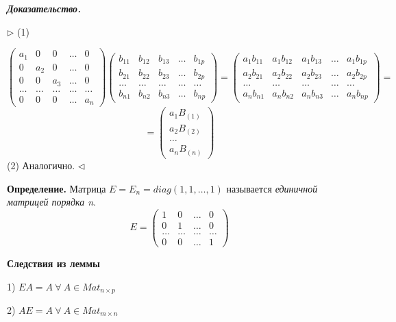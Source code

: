 \textbf{\textit{Доказательство.}}

$\rhd$ (1)

\[\begin{pmatrix} a_1 & 0 & 0 & \dots & 0 \\
0 & a_2 & 0 & \dots & 0 \\
0 & 0 & a_3 & \dots & 0 \\
\dots & \dots & \dots & \dots & \dots \\
0 & 0 & 0 & \dots & a_n 
\end{pmatrix} \begin{pmatrix} b_{11} & b_{12} & b_{13} & \dots & b_{1p} \\
b_{21} & b_{22} & b_{23} & \dots & b_{2p} \\
\dots & \dots & \dots & \dots & \dots \\
b_{n1} & b_{n2} & b_{n3} & \dots & b_{np}
\end{pmatrix} = \begin{pmatrix} a_1 b_{11} & a_1 b_{12} & a_1 b_{13} & \dots & a_1 b_{1p} \\
a_2 b_{21} & a_2 b_{22} & a_2 b_{23} & \dots & a_2 b_{2p} \\
\dots & \dots & \dots & \dots & \dots \\
a_n b_{n1} & a_n b_{n2} & a_n b_{n3} & \dots & a_n b_{np}
\end{pmatrix} = \]
\[ = \begin{pmatrix} a_1 B_{(1)} \\ a_2 B_{(2)} \\ \dots \\ a_n B_{(n)} \end{pmatrix} \]
(2) Аналогично. $\lhd$

\vspace{\baselineskip}
\textbf{Определение.} Матрица $E = E_n = diag(1, 1, \dots, 1)$ называется \textit{единичной матрицей порядка n}.
\[ E = \begin{pmatrix} 1 & 0 & \dots & 0 \\ 
0 & 1 & \dots & 0 \\
\dots & \dots & \dots & \dots \\
0 & 0 & \dots & 1 
\end{pmatrix} \]

\vspace{\baselineskip}
\textbf{Следствия из леммы}

1) $EA = A \ \forall \ A \in Mat_{n \times p}$

2) $AE = A \ \forall \ A \in Mat_{m \times n}$

